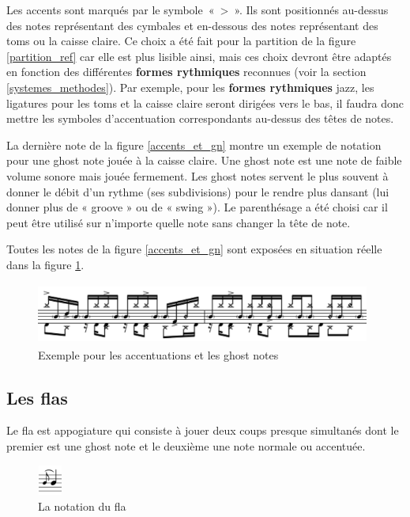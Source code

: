 Les accents sont marqués par le symbole~«~>~». Ils sont positionnés au-dessus
des notes représentant des cymbales et en-dessous des notes représentant des
toms ou la caisse claire. Ce choix a été fait pour la partition de la figure
\ref{partition_ref} car elle est plus lisible ainsi, mais ces choix devront
être adaptés en fonction des différentes \textbf{formes rythmiques} reconnues
(voir la section \ref{systemes_methodes}). Par exemple, pour les
\textbf{formes rythmiques} jazz, les ligatures pour les toms et la caisse
claire seront dirigées vers le bas, il faudra donc mettre les symboles
d’accentuation correspondants au-dessus des têtes de notes.

La dernière note de la figure \ref{accents_et_gn} montre un exemple de notation
pour une ghost note jouée à la caisse claire. Une ghost note
\cite{lexique_drum} est une note de faible volume sonore mais jouée fermement.
Les ghost notes servent le plus souvent à donner le débit d’un rythme (ses
subdivisions) pour le rendre plus dansant (lui donner plus de « groove » ou de
« swing »). Le parenthésage a été choisi car il peut être utilisé sur n’importe
quelle note sans changer la tête de note.

Toutes les notes de la figure \ref{accents_et_gn} sont exposées en situation
réelle dans la figure \ref{exemple_acc_et_gn}. 
\begin{figure}[h]
\centering
\includegraphics[height=20mm, width=110mm]{
z_images/3_methodes/0_notation_de_la_batterie/8_accents_et_ghost-notes_1.png}
\caption{Exemple pour les accentuations et les ghost notes}
\label{exemple_acc_et_gn}
\end{figure}

\subsection*{Les flas}
Le fla est appogiature qui consiste à jouer deux coups presque simultanés dont
le premier est une ghost note et le deuxième une note normale ou accentuée.
\begin{figure}[h]
    \centering
    \includegraphics[height=10mm, width=8mm]{
    z_images/3_methodes/0_notation_de_la_batterie/fla_def.png}
    \caption{La notation du fla}
\end{figure}

